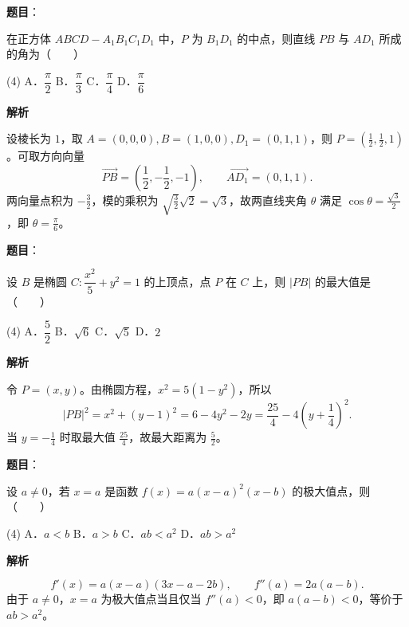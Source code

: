 \begin{answer}

\textbf{题目}：

在正方体 $ABCD-A_1B_1C_1D_1$ 中，$P$ 为 $B_1D_1$ 的中点，则直线 $PB$ 与 $AD_1$ 所成的角为\mbox{（　　）}

\begin{gkopts}(4)
\task A．$\dfrac{\pi}{2}$
\task B．$\dfrac{\pi}{3}$
\task C．$\dfrac{\pi}{4}$
\task D．$\dfrac{\pi}{6}$
\end{gkopts}

\textbf{解析}

设棱长为 $1$，取 $A=(0,0,0),B=(1,0,0),D_1=(0,1,1)$，则
$P=(\frac12,\frac12,1)$。可取方向向量
\nopagebreak[4]
\[
\overrightarrow{PB}=\left(\frac12,-\frac12,-1\right),\qquad
\overrightarrow{AD_1}=(0,1,1).
\]
两向量点积为 $-\frac32$，模的乘积为 $\sqrt{\frac32}\sqrt2=\sqrt3$，故两直线夹角 $\theta$ 满足 $\cos\theta=\frac{\sqrt3}{2}$，即 $\theta=\frac\pi6$。


\end{answer}
\begin{answer}

\textbf{题目}：

设 $B$ 是椭圆 $C:\dfrac{x^2}{5}+y^2=1$ 的上顶点，点 $P$ 在 $C$ 上，则 $|PB|$ 的最大值是\mbox{（　　）}

\begin{gkopts}(4)
\task A．$\dfrac52$
\task B．$\sqrt6$
\task C．$\sqrt5$
\task D．$2$
\end{gkopts}

\textbf{解析}

令 $P=(x,y)$。由椭圆方程，$x^2=5(1-y^2)$，所以
\nopagebreak[4]
\[
|PB|^2=x^2+(y-1)^2=6-4y^2-2y
=\frac{25}{4}-4\left(y+\frac14\right)^2.
\]
当 $y=-\frac14$ 时取最大值 $\frac{25}{4}$，故最大距离为 $\frac52$。


\end{answer}
\begin{answer}

\textbf{题目}：

设 $a\ne0$，若 $x=a$ 是函数 $f(x)=a(x-a)^2(x-b)$ 的极大值点，则\mbox{（　　）}

\begin{gkopts}(4)
\task A．$a<b$
\task B．$a>b$
\task C．$ab<a^2$
\task D．$ab>a^2$
\end{gkopts}

\enlargethispage{2cm}

\textbf{解析}

\nopagebreak[4]
\[
f'(x)=a(x-a)(3x-a-2b),\qquad f''(a)=2a(a-b).
\]
由于 $a\ne0$，$x=a$ 为极大值点当且仅当 $f''(a)<0$，即 $a(a-b)<0$，等价于 $ab>a^2$。


\end{answer}

